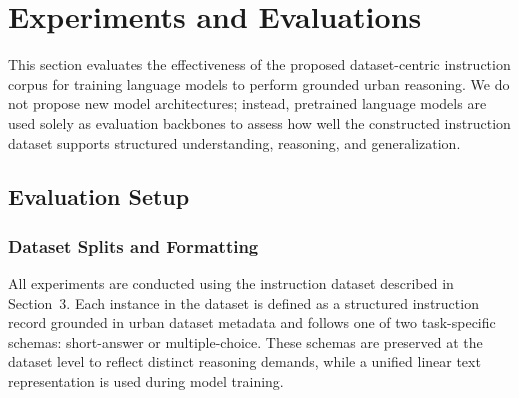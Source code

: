 \documentclass[a4paper,fleqn]{cas-sc}
\begin{document}


\section{Experiments and Evaluations}
This section evaluates the effectiveness of the proposed dataset-centric instruction corpus for training language models to perform grounded urban reasoning. We do not propose new model architectures; instead, pretrained language models are used solely as evaluation backbones to assess how well the constructed instruction dataset supports structured understanding, reasoning, and generalization.

\subsection{Evaluation Setup}
\subsubsection{Dataset Splits and Formatting}
All experiments are conducted using the instruction dataset described in Section~3. 
Each instance in the dataset is defined as a structured instruction record grounded in urban dataset metadata and follows one of two task-specific schemas: short-answer or multiple-choice. 
These schemas are preserved at the dataset level to reflect distinct reasoning demands, while a unified linear text representation is used during model training.
\end{document}
